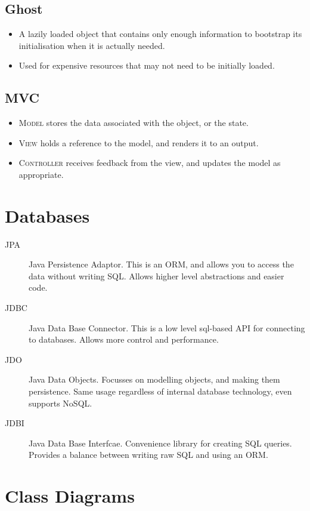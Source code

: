 \documentclass[landscape]{cheat}
\begin{document}
\begin{multicols*}{3}
\subsection{Ghost}
\begin{itemize}
    \item A lazily loaded object that contains only enough information to bootstrap its initialisation when it is actually needed.
    \item Used for expensive resources that may not need to be initially loaded.
\end{itemize}

\subsection{MVC}
\begin{itemize}
    \item \textsc{Model} stores the data associated with the object, or the state.
    \item \textsc{View} holds a reference to the model, and renders it to an output.
    \item \textsc{Controller} receives feedback from the view, and updates the model as appropriate.
\end{itemize}

\section{Databases}

\begin{description}
    \item[JPA] Java Persistence Adaptor.
        This is an ORM, and allows you to access the data without writing SQL.
        Allows higher level abstractions and easier code.
    \item[JDBC] Java Data Base Connector.
        This is a low level sql-based API for connecting to databases.
        Allows more control and performance.
    \item[JDO] Java Data Objects.
        Focusses on modelling objects, and making them persistence.
        Same usage regardless of internal database technology, even supports NoSQL.
    \item[JDBI] Java Data Base Interfcae.
        Convenience library for creating SQL queries.
        Provides a balance between writing raw SQL and using an ORM.
\end{description}

\section{Class Diagrams}


\end{multicols*}
\end{document}
